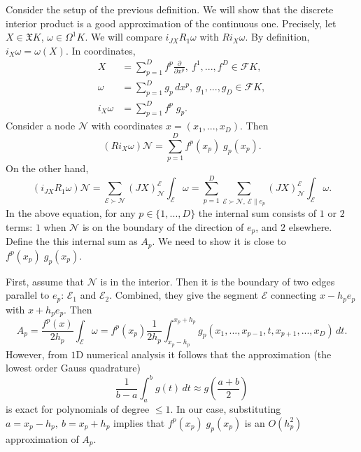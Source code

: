 \begin{remark}
  Consider the setup of the previous definition.
  We will show that the discrete interior product is a good approximation of the
  continuous one.
  Precisely, let $X \in \mathfrak{X} K$, $\omega \in \Omega^1 K$.
  We will compare $i_{J X}{R_1 \omega}$ with $R i_X \omega$.
  By definition, $i_X \omega = \omega(X)$.
  In coordinates,
  \begin{align}
    X & = \sum_{p = 1}^D {f^p} \frac{\partial}{\partial x^p},\
      f^1, ..., f^D \in \mathcal{F} K, \\
    \omega & = \sum_{p = 1}^D {g_p}\, d x^p,\
      g_1, ..., g_D \in \mathcal{F} K, \\
    i_X \omega & = \sum_{p = 1}^D f^p\; g_p.
  \end{align}
  Consider a node $\mathcal{N}$ with coordinates $x = (x_1, ..., x_D)$.
  Then
  \begin{equation}
    (R i_X \omega) \mathcal{N} = \sum_{p = 1}^D f^p(x_p)\; g_p(x_p).
  \end{equation}
  On the other hand,
  \begin{equation}
    (i_{J X}{R_1 \omega}) \mathcal{N}
    = \sum_{\mathcal{E} \succ \mathcal{N}}
      (J X)^{\mathcal{E}}_{\mathcal{N}} \int_{\mathcal{E}} \omega
    = \sum_{p = 1}^D
      \sum_{\mathcal{E} \succ \mathcal{N},\ \mathcal{E} \parallel e_p}
        (J X)^{\mathcal{E}}_{\mathcal{N}} \int_{\mathcal{E}} \omega.
  \end{equation}
  In the above equation, for any $p \in \{1, ..., D\}$
  the internal sum consists of $1$ or $2$ terms:
  $1$ when $\mathcal{N}$ is on the boundary of the direction of $e_p$,
  and $2$ elsewhere.
  Define the this internal sum as $A_p$.
  We need to show it is close to $f^p(x_p)\; g_p(x_p)$.
  
  First, assume that $\mathcal{N}$ is in the interior.
  Then it is the boundary of two edges parallel to $e_p$:
  $\mathcal{E}_1$ and $\mathcal{E}_2$.
  Combined, they give the segment $\mathcal{E}$ connecting
  $x - h_p e_p$ with $x + h_p e_p$.
  Then
  \begin{equation}
    A_p = \frac{f^p(x)}{2 h_p} \int_{\mathcal{E}} \omega
    = f^p(x_p) \frac{1}{2 h_p}
      \int_{x_p - h_p}^{x_p + h_p}
      g_p(x_1, ..., x_{p - 1}, t, x_{p + 1}, ..., x_D)\, d t.
  \end{equation}
  However, from $1$D numerical analysis it follows that the approximation
  (the lowest order Gauss quadrature)
  \begin{equation}
    \frac{1}{b - a} \int_a^b g(t)\, d t \approx g\left(\frac{a + b}{2}\right)
  \end{equation}
  is exact for polynomials of degree $\leq 1$.
  In our case, substituting $a = x_p - h_p,\ b = x_p + h_p$
  implies that $f^p(x_p)\; g_p(x_p)$ is an $O(h_p^2)$ approximation of $A_p$.


\end{remark}
